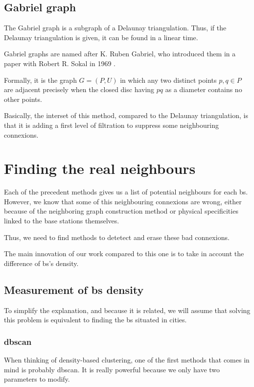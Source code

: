 \documentclass[lettersize,journal,english]{IEEEtran}
\begin{document}
\subsection{Gabriel graph}
\noindent The Gabriel graph is a subgraph of a Delaunay triangulation. Thus, if the Delaunay triangulation is given, it can be found in a linear time. 

Gabriel graphs are named after K. Ruben Gabriel, who introduced them in a paper with Robert R. Sokal in 1969 \cite{10.2307/2412323}.

Formally, it is the graph $G = (P, U)$ in which any two distinct points $p, q \in P$ are adjacent precisely when the closed disc having $pq$ as a diameter contains no other points.

Basically, the interset of this method, compared to the Delaunay triangulation, is that it is adding a first level of filtration to suppress some neighbouring connexions.

\section{Finding the real neighbours}

\noindent Each of the precedent methods gives us a list of potential neighbours for each \acrshort{bs}. However, we know that some of this neighbouring connexions are wrong,
either because of the neighboring graph construction method or physical specificities linked to the base stations themselves.

Thus, we need to find methods to detetect and erase these bad connexions.

The main innovation of our work compared to this one \cite{art_del_paq} is to take in account the difference of \acrshort{bs}'s density.

\subsection{Measurement of \acrshort{bs} density}
\noindent To simplify the explanation, and because it is related, we will assume that solving this problem is equivalent to finding the \acrshort{bs} situated in \og cities\fg{}.

\subsubsection{\acrshort{dbscan}}
When thinking of density-based clustering, one of the first methods that comes in mind is probably \acrshort{dbscan}.
It is really powerful because we only have two parameters to modify.
\end{document}
